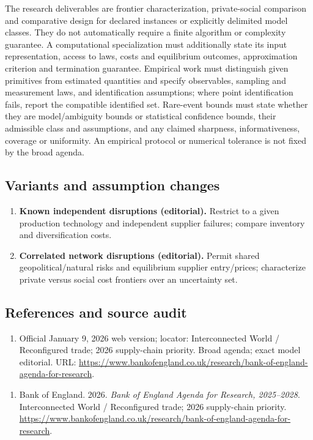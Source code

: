 \documentclass[11pt,a4paper]{article}
\begin{document}
The research deliverables are frontier characterization, private-social comparison and comparative design for declared instances or explicitly delimited model classes. They do not automatically require a finite algorithm or complexity guarantee. A computational specialization must additionally state its input representation, access to laws, costs and equilibrium outcomes, approximation criterion and termination guarantee. Empirical work must distinguish given primitives from estimated quantities and specify observables, sampling and measurement laws, and identification assumptions; where point identification fails, report the compatible identified set. Rare-event bounds must state whether they are model/ambiguity bounds or statistical confidence bounds, their admissible class and assumptions, and any claimed sharpness, informativeness, coverage or uniformity. An empirical protocol or numerical tolerance is not fixed by the broad agenda.
\subsection*{Variants and assumption changes}
\begin{enumerate}
\item \textbf{Known independent disruptions (editorial).} Restrict to a given production technology and independent supplier failures; compare inventory and diversification costs.
\item \textbf{Correlated network disruptions (editorial).} Permit shared geopolitical/natural risks and equilibrium supplier entry/prices; characterize private versus social cost frontiers over an uncertainty set.
\end{enumerate}
\subsection*{References and source audit}
\begin{enumerate}
\item Official January 9, 2026 web version; locator: Interconnected World / Reconfigured trade; 2026 supply-chain priority. Broad agenda; exact model editorial. URL: \url{https://www.bankofengland.co.uk/research/bank-of-england-agenda-for-research}.
\end{enumerate}
\begin{enumerate}\raggedright
\item\hypertarget{definitions:source:30007627:1}{} Bank of England. 2026. \emph{Bank of England Agenda for Research, 2025–2028}. Interconnected World / Reconfigured trade; 2026 supply-chain priority.
\url{https://www.bankofengland.co.uk/research/bank-of-england-agenda-for-research}.
\end{enumerate}
\end{document}
